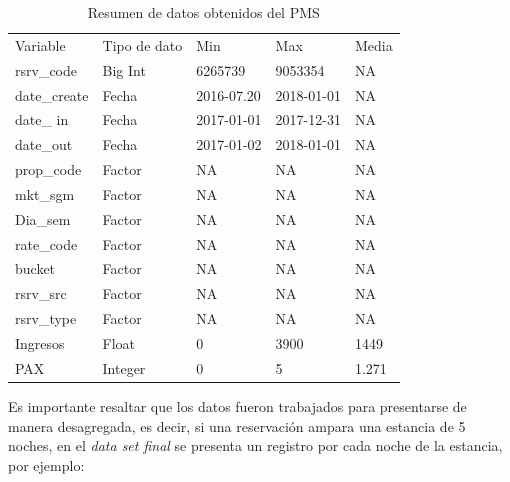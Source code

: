 \begin{table}[H]
\begin{tabular}{lllll}
Variable     & Tipo de dato & Min        & Max        & Media \\
rsrv\_code   & Big Int      & 6265739    & 9053354    & NA    \\
date\_create & Fecha        & 2016-07.20 & 2018-01-01 & NA    \\
date\_ in    & Fecha        & 2017-01-01 & 2017-12-31 & NA    \\
date\_out    & Fecha        & 2017-01-02 & 2018-01-01 & NA    \\
prop\_code   & Factor       & NA         & NA         & NA    \\
mkt\_sgm     & Factor       & NA         & NA         & NA    \\
Dia\_sem     & Factor       & NA         & NA         & NA    \\
rate\_code   & Factor       & NA         & NA         & NA    \\
bucket       & Factor       & NA         & NA         & NA    \\
rsrv\_src    & Factor       & NA         & NA         & NA    \\
rsrv\_type   & Factor       & NA         & NA         & NA    \\
Ingresos     & Float        & 0          & 3900       & 1449  \\
PAX          & Integer      & 0          & 5          & 1.271 \\
\end{tabular}
\caption{Resumen de datos obtenidos del PMS} 
\end{table}

Es importante resaltar que los datos fueron trabajados para presentarse de manera desagregada, es decir, si una reservación ampara una estancia de 5 noches, en el \emph{data set final} se presenta un registro por cada noche de la estancia, por ejemplo:

